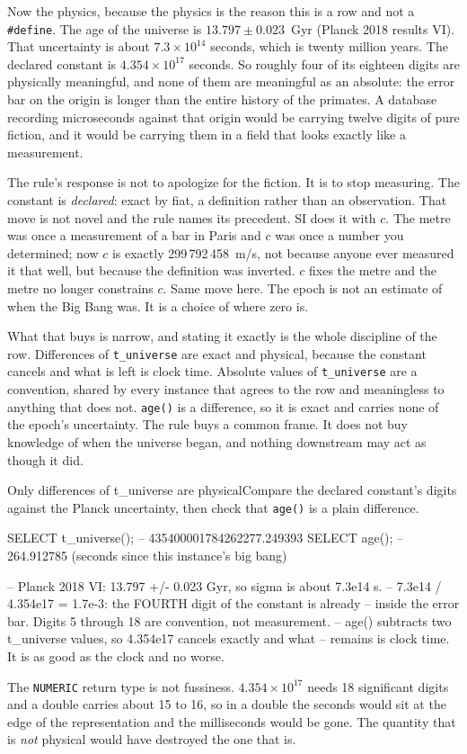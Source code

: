 Now the physics, because the physics is the reason this is a row and not a \texttt{\#define}. The age of the universe is $13.797 \pm 0.023$~Gyr (Planck 2018 results VI). That uncertainty is about $7.3 \times 10^{14}$ seconds, which is twenty million years. The declared constant is $4.354 \times 10^{17}$ seconds. So roughly four of its eighteen digits are physically meaningful, and none of them are meaningful as an absolute: the error bar on the origin is longer than the entire history of the primates. A database recording microseconds against that origin would be carrying twelve digits of pure fiction, and it would be carrying them in a field that looks exactly like a measurement.

The rule's response is not to apologize for the fiction. It is to stop measuring. The constant is \emph{declared}: exact by fiat, a definition rather than an observation. That move is not novel and the rule names its precedent. SI does it with $c$. The metre was once a measurement of a bar in Paris and $c$ was once a number you determined; now $c$ is exactly 299\,792\,458~m/s, not because anyone ever measured it that well, but because the definition was inverted. $c$ fixes the metre and the metre no longer constrains $c$. Same move here. The epoch is not an estimate of when the Big Bang was. It is a choice of where zero is.

What that buys is narrow, and stating it exactly is the whole discipline of the row. Differences of \texttt{t\_universe} are exact and physical, because the constant cancels and what is left is clock time. Absolute values of \texttt{t\_universe} are a convention, shared by every instance that agrees to the row and meaningless to anything that does not. \texttt{age()} is a difference, so it is exact and carries none of the epoch's uncertainty. The rule buys a common frame. It does not buy knowledge of when the universe began, and nothing downstream may act as though it did.

\begin{Correspondence}{Only differences of t\_universe are physical}{Compare the declared constant's digits against the Planck uncertainty, then check that \texttt{age()} is a plain difference.}
\begin{Check}
SELECT t_universe();   -- 435400001784262277.249393
SELECT age();          -- 264.912785   (seconds since this instance's big bang)

-- Planck 2018 VI: 13.797 +/- 0.023 Gyr, so sigma is about 7.3e14 s.
-- 7.3e14 / 4.354e17 = 1.7e-3: the FOURTH digit of the constant is already
-- inside the error bar. Digits 5 through 18 are convention, not measurement.
-- age() subtracts two t_universe values, so 4.354e17 cancels exactly and what
-- remains is clock time. It is as good as the clock and no worse.
\end{Check}
The \texttt{NUMERIC} return type is not fussiness. $4.354 \times 10^{17}$ needs 18 significant digits and a double carries about 15 to 16, so in a double the seconds would sit at the edge of the representation and the milliseconds would be gone. The quantity that is \emph{not} physical would have destroyed the one that is.
\end{Correspondence}

